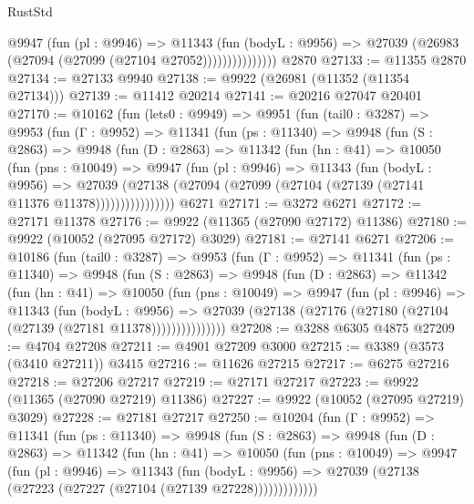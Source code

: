 \begin{lexlean}{RustStd}
\begin{coremodule}
                    @9947
                      (fun (pl : @9946) =>
                      @11343
                        (fun (bodyL : @9956) =>
                        @27039 (@26983 (@27094 (@27099 (@27104 @27052)))))))))))))))
    @2870
@27133 := @11355 @2870
@27134 := @27133 @9940
@27138 := @9922 (@26981 (@11352 (@11354 @27134)))
@27139 := @11412 @20214
@27141 := @20216 @27047 @20401
@27170 := @10162
    (fun (lets0 : @9949) =>
    @9951
      (fun (tail0 : @3287) =>
      @9953
        (fun (Γ : @9952) =>
        @11341
          (fun (ps : @11340) =>
          @9948
            (fun (S : @2863) =>
            @9948
              (fun (D : @2863) =>
              @11342
                (fun (hn : @41) =>
                @10050
                  (fun (pns : @10049) =>
                  @9947
                    (fun (pl : @9946) =>
                    @11343
                      (fun (bodyL : @9956) =>
                      @27039
                        (@27138
                          (@27094 (@27099 (@27104 (@27139 (@27141 @11376 @11378))))))))))))))))
    @6271
@27171 := @3272 @6271
@27172 := @27171 @11378
@27176 := @9922 (@11365 (@27090 @27172) @11386)
@27180 := @9922 (@10052 (@27095 @27172) @3029)
@27181 := @27141 @6271
@27206 := @10186
    (fun (tail0 : @3287) =>
    @9953
      (fun (Γ : @9952) =>
      @11341
        (fun (ps : @11340) =>
        @9948
          (fun (S : @2863) =>
          @9948
            (fun (D : @2863) =>
            @11342
              (fun (hn : @41) =>
              @10050
                (fun (pns : @10049) =>
                @9947
                  (fun (pl : @9946) =>
                  @11343
                    (fun (bodyL : @9956) =>
                    @27039 (@27138 (@27176 (@27180 (@27104 (@27139 (@27181 @11378)))))))))))))))
@27208 := @3288 @6305 @4875
@27209 := @4704 @27208
@27211 := @4901 @27209 @3000
@27215 := @3389 (@3573 (@3410 @27211)) @3415
@27216 := @11626 @27215
@27217 := @6275 @27216
@27218 := @27206 @27217
@27219 := @27171 @27217
@27223 := @9922 (@11365 (@27090 @27219) @11386)
@27227 := @9922 (@10052 (@27095 @27219) @3029)
@27228 := @27181 @27217
@27250 := @10204
    (fun (Γ : @9952) =>
    @11341
      (fun (ps : @11340) =>
      @9948
        (fun (S : @2863) =>
        @9948
          (fun (D : @2863) =>
          @11342
            (fun (hn : @41) =>
            @10050
              (fun (pns : @10049) =>
              @9947
                (fun (pl : @9946) =>
                @11343
                  (fun (bodyL : @9956) =>
                  @27039 (@27138 (@27223 (@27227 (@27104 (@27139 @27228)))))))))))))

\end{coremodule}
\end{lexlean}

